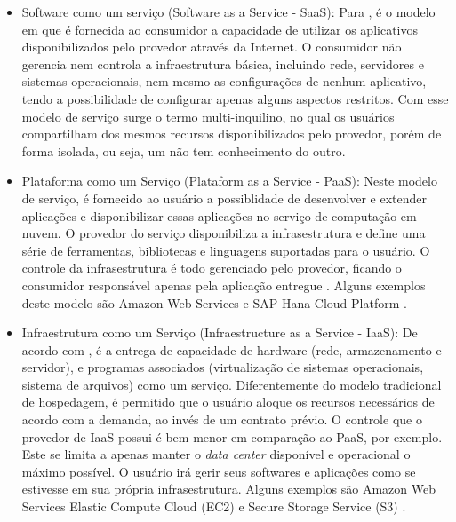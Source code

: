 \documentclass[twoside,english,brazilian]{UNISINOSmonografia}
\begin{document}
\begin{itemize}
	\item Software como um serviço (Software as a Service - SaaS): Para , é o modelo em que é fornecida ao consumidor a capacidade de utilizar os aplicativos disponibilizados pelo provedor através da Internet. O consumidor não gerencia nem controla a infraestrutura básica, incluindo rede, servidores e sistemas operacionais, nem mesmo as configurações de nenhum aplicativo, tendo a possibilidade de configurar apenas alguns aspectos restritos. Com esse modelo de serviço surge o termo multi-inquilino, no qual os usuários compartilham dos mesmos recursos disponibilizados pelo provedor, porém de forma isolada, ou seja, um não tem conhecimento do outro.
	\item Plataforma como um Serviço (Plataform as a Service - PaaS): Neste modelo de serviço, é fornecido ao usuário a possiblidade de desenvolver e extender aplicações e disponibilizar essas aplicações no serviço de computação em nuvem. O provedor do serviço disponibiliza a infrasestrutura e define uma série de ferramentas, bibliotecas e linguagens suportadas para o usuário. O controle da infrasestrutura é todo gerenciado pelo provedor, ficando o consumidor responsável apenas pela aplicação entregue \cite{Mell2012,verascloud}. Alguns exemplos deste modelo são Amazon Web Services  e SAP Hana Cloud Platform . 
	\item Infraestrutura como um Serviço (Infraestructure as a Service - IaaS): De acordo com , é a entrega de capacidade de hardware (rede, armazenamento e servidor), e programas associados (virtualização de sistemas operacionais, sistema de arquivos) como um serviço. Diferentemente do modelo tradicional de hospedagem, é permitido que o usuário aloque os recursos necessários de acordo com a demanda, ao invés de um contrato prévio. O controle que o provedor de IaaS possui é bem menor em comparação ao PaaS, por exemplo. Este se limita a apenas manter o \textit{data center} disponível e operacional o máximo possível. O usuário irá gerir seus softwares e aplicações como se estivesse em sua própria infrasestrutura. Alguns exemplos são Amazon Web Services Elastic Compute Cloud (EC2) e Secure Storage Service (S3) \cite{AWS}.
\end{itemize}
\end{document}
